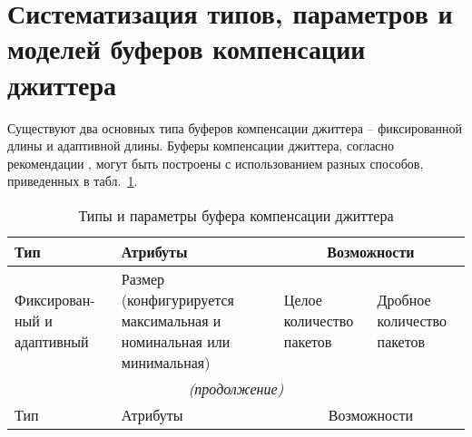 \section{Систематизация типов, параметров и моделей буферов компенсации джиттера} \label{sect3_3}

Существуют два основных типа буферов компенсации джиттера – фиксированной длины и адаптивной длины. Буферы компенсации джиттера, согласно рекомендации \cite{G1020}, могут быть построены с использованием разных способов, приведенных в табл. \ref{TypeBuff}.


\begin{longtable}{|p{3cm}||p{4cm}|p{4cm}|p{3.5cm}|}
\caption{Типы и параметры буфера компенсации джиттера}\label{TypeBuff}
    \hline
    Тип         & Атрибуты    & \multicolumn{2}{c|}{Возможности}  \\ \hline 
    Фиксирован- ный и адаптивный & Размер (конфигурируется максимальная и номинальная или минимальная) & Целое количество пакетов                                                     & Дробное количество пакетов         \\  \hline \hline
    \endfirsthead   \hline
 \multicolumn{4}{|c|}{\small\slshape (продолжение)}        \\ \hline
 Тип                        & Атрибуты                                                            & \multicolumn{2}{c|}{Возможности}     \\ \hline 
        

\end{longtable}
